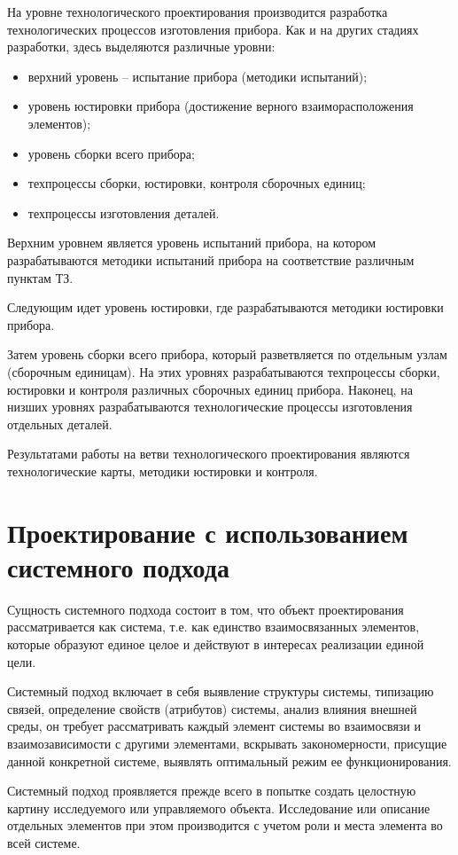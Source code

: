 На уровне технологического проектирования производится разработка технологических процессов изготовления прибора. Как и на других стадиях разработки, здесь выделяются различные уровни:
\begin{itemize}
	\item верхний уровень -- испытание прибора (методики испытаний);
	\item уровень юстировки прибора (достижение верного взаиморасположения элементов);
	\item уровень сборки всего прибора;
	\item техпроцессы сборки, юстировки, контроля сборочных единиц;
	\item техпроцессы изготовления деталей. 
\end{itemize}

Верхним уровнем является уровень испытаний прибора, на котором разрабатываются методики испытаний прибора на соответствие различным пунктам ТЗ.

Следующим идет уровень юстировки, где разрабатываются методики юстировки прибора.

Затем уровень сборки всего прибора, который разветвляется по отдельным узлам (сборочным единицам). На этих уровнях разрабатываются техпроцессы сборки, юстировки и контроля различных сборочных единиц прибора. Наконец, на низших уровнях разрабатываются технологические процессы изготовления отдельных деталей.

Результатами работы на ветви технологического проектирования являются технологические карты, методики юстировки и контроля.

\section{Проектирование с использованием системного подхода}
Сущность системного подхода состоит в том, что объект проектирования рассматривается как система, т.е. как единство взаимосвязанных элементов, которые образуют единое целое и действуют в интересах реализации единой цели. 

Системный подход включает в себя выявление структуры системы, типизацию связей, определение свойств (атрибутов) системы, анализ влияния внешней среды, он требует рассматривать каждый элемент системы во взаимосвязи и взаимозависимости с другими элементами, вскрывать закономерности, присущие данной конкретной системе, выявлять оптимальный режим ее функционирования. 

Системный подход проявляется прежде всего в попытке создать целостную картину исследуемого или управляемого объекта. Исследование или описание отдельных элементов при этом производится с учетом роли и места элемента во всей системе.


